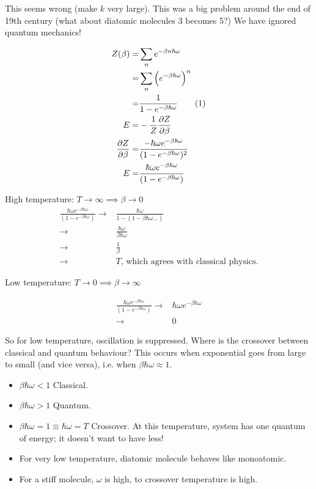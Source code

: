 \documentclass[]{article}
\newcommand\numberthis{\addtocounter{equation}{1}\tag{\theequation}}
\begin{document}
This seems wrong (make $k$ very large). This was a big problem around the end of 19th century (what about diatomic molecules 3 becomes 5?) We have ignored quantum mechanics!

\begin{align*}
	Z(\beta) =& \sum_{n} e^{- \beta n \hbar \omega}\\
	 =& \sum_{n} \Big(e^{- \beta\hbar \omega}\Big)^n\\
	 =& \frac{1}{1 - e^{- \beta\hbar \omega}}\numberthis\label{Z_quantum_shm}\\
	 E =& - \frac{1}{Z} \frac{\partial Z}{\partial \beta}\\
	 \frac{\partial Z}{\partial \beta}=& \frac{- \hbar \omega e^{- \beta\hbar \omega}}{(1 - e^{- \beta\hbar \omega})^2}\\
	 E =& \frac{ \hbar \omega e^{- \beta\hbar \omega}}{(1 - e^{- \beta\hbar \omega})}
\end{align*}

High temperature: $T\rightarrow\infty \implies \beta \rightarrow 0$
\begin{align*}
	\frac{ \hbar \omega e^{- \beta\hbar \omega}}{(1 - e^{- \beta\hbar \omega})}\rightarrow& \frac{\hbar \omega}{1 -(1 - \beta \hbar \omega...)}\\
	\rightarrow& \frac{\hbar \omega}{\beta \hbar \omega}\\
	\rightarrow& \frac{1}{\beta}\\
	\rightarrow& T\text{, which agrees with classical physics.}
\end{align*}

Low temperature: $T\rightarrow 0 \implies \beta \rightarrow \infty$

\begin{align*}
\frac{ \hbar \omega e^{- \beta\hbar \omega}}{(1 - e^{- \beta\hbar \omega})}\rightarrow&\hbar \omega e^{- \beta\hbar \omega}\\
\rightarrow&0
\end{align*}

So for low temperature, oscillation is suppressed.	Where is the crossover between classical and quantum behaviour? This occurs when exponential goes from large to small (and vice versa), i.e. when $\beta\hbar \omega \approx 1$.

\begin{itemize}
	\item $\beta\hbar \omega < 1$ Classical.
	\item $\beta\hbar \omega > 1$ Quantum.
	\item $\beta\hbar \omega = 1\equiv\hbar \omega=T$ Crossover. At this temperature, system has one quantum of energy; it doesn't want to have less!
	\item For very low temperature, diatomic molecule behaves like monoatomic.
	\item For a stiff molecule, $\omega$ is high, to crossover temperature is high.
\end{itemize}
\end{document}
